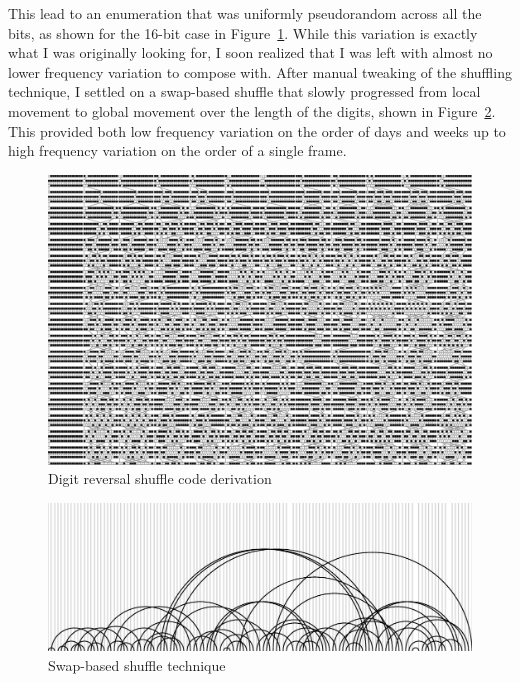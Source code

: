 \documentclass{thesis}
\begin{document}
This lead to an enumeration that was uniformly pseudorandom across all the bits, as shown for the 16-bit case in Figure~\ref{enumeration-diagram}. While this variation is exactly what I was originally looking for, I soon realized that I was left with almost no lower frequency variation to compose with. After manual tweaking of the shuffling technique, I settled on a swap-based shuffle that slowly progressed from local movement to global movement over the length of the digits, shown in Figure~\ref{swap-shuffle}. This provided both low frequency variation on the order of days and weeks up to high frequency variation on the order of a single frame.

\begin{figure}
	\begin{center}
		\includegraphics[scale=.5, angle=90]{graphics/enumeration-diagram.pdf}
		\caption{Digit reversal shuffle code derivation}
		\label{enumeration-diagram}
	\end{center}
\end{figure}

\begin{figure}
	\begin{center}
		\includegraphics[scale=.5]{graphics/actual-arcs.pdf}
		\caption{Swap-based shuffle technique}
		\label{swap-shuffle}
	\end{center}
\end{figure}
\end{document}
